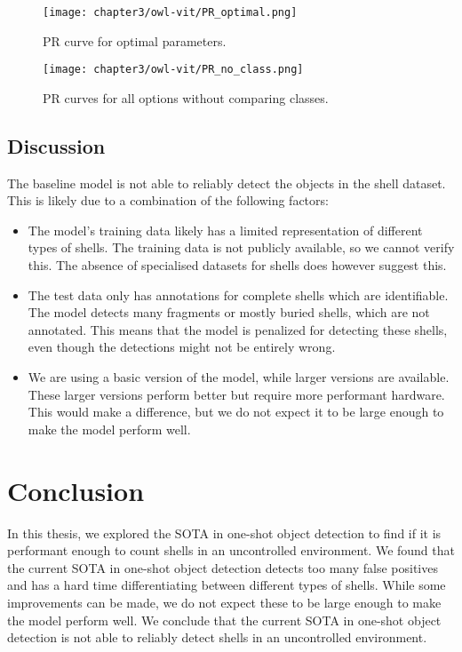 \begin{figure}[h]
    \centering
    \texttt{[image: chapter3/owl-vit/PR\_optimal.png]}
    \caption{PR curve for optimal parameters.}
    \label{fig:3_optimal}
\end{figure}

\begin{figure}[h]
    \centering
    \texttt{[image: chapter3/owl-vit/PR\_no\_class.png]}
    \caption{PR curves for all options without comparing classes.}
    \label{fig:3_pr_curves_all_options_no_class_comparison}
\end{figure}

\subsection{Discussion}
The baseline model is not able to reliably detect the objects in the shell dataset. This is likely due to a combination of the following factors:
\begin{itemize}
    \item The model's training data likely has a limited representation of different types of shells. The training data is not publicly available, so we cannot verify this. The absence of specialised datasets for shells does however suggest this.
    \item The test data only has annotations for complete shells which are identifiable. The model detects many fragments or mostly buried shells, which are not annotated. This means that the model is penalized for detecting these shells, even though the detections might not be entirely wrong.
    \item We are using a basic version of the model, while larger versions are available. These larger versions perform better but require more performant hardware. This would make a difference, but we do not expect it to be large enough to make the model perform well.
\end{itemize}

\section{Conclusion}
In this thesis, we explored the SOTA in one-shot object detection to find if it is performant enough to count shells in an uncontrolled environment. We found that the current SOTA in one-shot object detection detects too many false positives and has a hard time differentiating between different types of shells. While some improvements can be made, we do not expect these to be large enough to make the model perform well. We conclude that the current SOTA in one-shot object detection is not able to reliably detect shells in an uncontrolled environment. 

